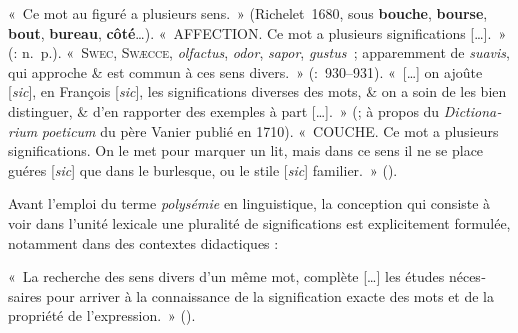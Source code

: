 \documentclass[output=paper]{langsci/langscibook}
\begin{document}
\begin{otherlanguage}{french}
\ea  «~Ce mot au figuré a plusieurs sens.~» (Richelet~1680, sous \textbf{bouche}, \textbf{bourse}, \textbf{bout}, \textbf{bureau}, \textbf{côté}…).
\ex «~AFFECTION. Ce mot a plusieurs significations […].~» (\citealt{regis_cours_1691}: n.~p.).
\ex  «~S\textsc{wec,} \textsc{Swæcce,} \textit{olfactus}, \textit{odor}, \textit{sapor}, \textit{gustus~}; apparemment de \textit{suavis}, qui approche \& est commun à ces sens divers.~» (\citealt[930--931]{thomassin_methode_1690}:~930--931).
\ex «~[…] on ajoûte [\textit{sic}], en François [\textit{sic}], les significations diverses des mots, \& on a soin de les bien distinguer, \& d’en rapporter des exemples à part […].~» (\citealt[172]{leclerc_bibliotheque_1715}; à propos du \textit{Dictionarium} \textit{poeticum} du père Vanier publié en 1710).
\ex «~COUCHE. Ce mot a plusieurs significations. On le met pour marquer un lit, mais dans ce sens il ne se place guéres [\textit{sic}] que dans le burlesque, ou le stile [\textit{sic}] familier.~» (\citealt[167]{le_roux_dictionaire_1735}).
\z

Avant l’emploi du terme \textit{polysémie} en linguistique, la conception qui consiste à voir dans l’unité lexicale une pluralité de significations est explicitement formulée, notamment dans des contextes didactiques :

\ea «~La recherche des sens divers d’un même mot, complète […] les études nécessaires pour arriver à la connaissance de la signification exacte des mots et de la propriété de l’expression.~» (\citealt[252]{michel_etudes_1858}).
\z


\end{otherlanguage}
\end{document}
